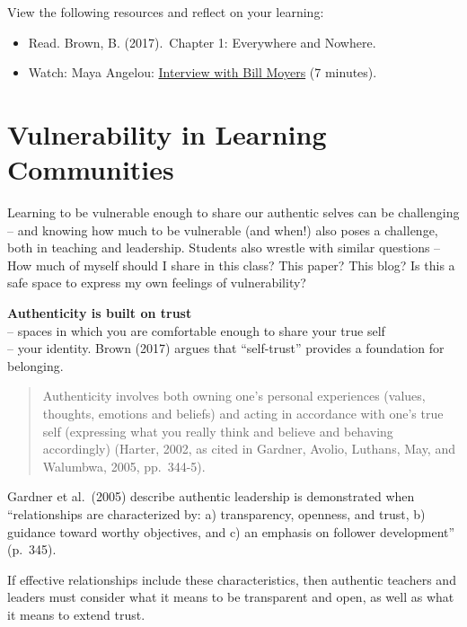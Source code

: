 \documentclass[
]{book}
\providecommand{\tightlist}{%
  \setlength{\itemsep}{0pt}\setlength{\parskip}{0pt}}
\begin{document}
\begin{reflect}
View the following resources and reflect on your learning:

\begin{itemize}
\tightlist
\item
  Read. Brown, B. (2017).~Chapter 1: Everywhere and Nowhere.\\
\item
  Watch: Maya Angelou:
  \href{http://billmoyers.com/content/conversation-maya-angelou/}{Interview
  with Bill Moyers} (7 minutes).
\end{itemize}
\end{reflect}

\hypertarget{vulnerability-in-learning-communities}{%
\section{Vulnerability in Learning Communities}\label{vulnerability-in-learning-communities}}

Learning to be vulnerable enough to share our authentic selves can be challenging -- and knowing how much to be vulnerable (and when!) also poses a challenge, both in teaching and leadership. Students also wrestle with similar questions -- How much of myself should I share in this class? This paper? This blog? Is this a safe space to express my own feelings of vulnerability?

\textbf{Authenticity is built on trust}\\
-- spaces in which you are comfortable enough to share your true self\\
-- your identity. Brown (2017) argues that ``self-trust'' provides a foundation for belonging.

\begin{quote}
Authenticity involves both owning one's personal experiences (values, thoughts, emotions and beliefs) and acting in accordance with one's true self (expressing what you really think and believe and behaving accordingly) (Harter, 2002, as cited in Gardner, Avolio, Luthans, May, and Walumbwa, 2005, pp.~344-5).
\end{quote}

Gardner et al.~(2005) describe authentic leadership is demonstrated when ``relationships are characterized by: a) transparency, openness, and trust, b) guidance toward worthy objectives, and c) an emphasis on follower development'' (p.~345).

If effective relationships include these characteristics, then authentic teachers and leaders must consider what it means to be transparent and open, as well as what it means to extend trust.
\end{document}
